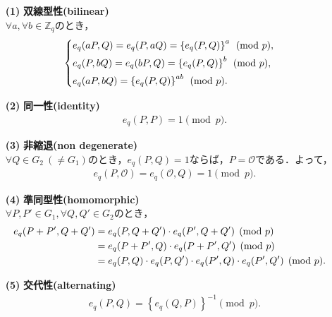 \documentclass[a4paper]{jsarticle}
\begin{document}
\begin{enumerate}
\item[\textbf{(1)}] \textbf{双線型性(bilinear)}\\
$\forall a,\forall b\in\mathbb{Z}_q$のとき，
\begin{align}
\begin{cases}\vspace{0.05in}
e_q(aP,Q) =e_q(P,aQ)=\left\{ e_q(P,Q) \right\}^a  \pmod{p},\\\vspace{0.05in}
e_q(P,bQ) =e_q(bP,Q)=\left\{ e_q(P,Q) \right\}^b  \pmod{p},\\
e_q(aP,bQ)=\left\{ e_q(P,Q) \right\}^{ab}  \pmod{p}.\\
\end{cases}
\end{align}
\item[\textbf{(2)}] \textbf{同一性(identity)}
\begin{align}
e_q(P,P) = 1\pmod{p}.
\end{align}
\item[\textbf{(3)}] \textbf{非縮退(non degenerate)}\\
$\forall Q\in G_2\ (\ne G_1)$のとき，$e_q(P,Q) = 1$ならば，$P=\mathcal{O}$である．よって，
\begin{align}
e_q(P,\mathcal{O}) = e_q(\mathcal{O}, Q) = 1\pmod{p}.
\end{align}
\item[\textbf{(4)}] \textbf{準同型性(homomorphic)}\\
$\forall P,P'\in G_1, \forall Q,Q'\in G_2$のとき，
\begin{align}
e_q(P+P', Q+Q') &= e_q(P, Q+Q')\cdot e_q(P', Q+Q') \pmod{p}&\notag\\
&=e_q(P+P', Q)\cdot e_q(P+P',Q') \pmod{p}&\\
&=e_q(P, Q) \cdot e_q(P, Q') \cdot e_q(P', Q) \cdot e_q(P', Q') \pmod{p}.&\notag
\end{align}

\item[\textbf{(5)}] \textbf{交代性(alternating)}
\begin{align}
e_q(P, Q) = \left\{ e_q(Q,P)\right\}^{-1}\pmod{p}.
\end{align}
\end{enumerate}
\end{document}
